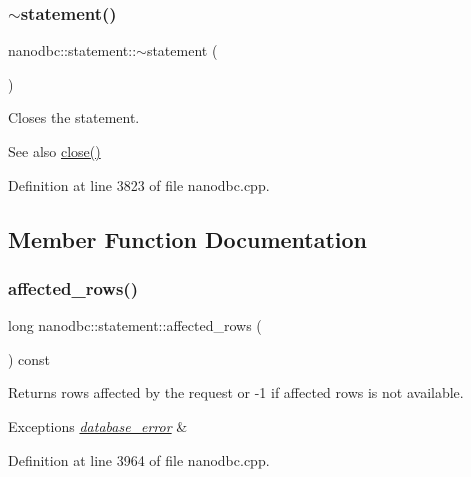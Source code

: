 \subsubsection{\texorpdfstring{$\sim$statement()}{~statement()}}
{\footnotesize\ttfamily nanodbc\+::statement\+::$\sim$statement (\begin{DoxyParamCaption}{ }\end{DoxyParamCaption})\hspace{0.3cm}{\ttfamily [noexcept]}}



Closes the statement. 

\begin{DoxySeeAlso}{See also}
\mbox{\hyperlink{classnanodbc_1_1statement_abcf1dda8ab40a3b8ebd33c69afa4a399}{close()}} 
\end{DoxySeeAlso}


Definition at line 3823 of file nanodbc.\+cpp.



\subsection{Member Function Documentation}
\mbox{\label{classnanodbc_1_1statement_af904239b45c5a45af262d41cc6441398}} 
\subsubsection{\texorpdfstring{affected\_rows()}{affected\_rows()}}
{\footnotesize\ttfamily long nanodbc\+::statement\+::affected\+\_\+rows (\begin{DoxyParamCaption}{ }\end{DoxyParamCaption}) const}



Returns rows affected by the request or -\/1 if affected rows is not available. 


\begin{DoxyExceptions}{Exceptions}
{\em \mbox{\hyperlink{classnanodbc_1_1database__error}{database\+\_\+error}}} & \\
\hline
\end{DoxyExceptions}


Definition at line 3964 of file nanodbc.\+cpp.

\mbox{\label{classnanodbc_1_1statement_ab5498ba941c04dfe1e7e47928161b0e5}} 

